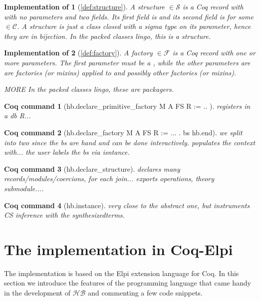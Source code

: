 \documentclass[a4paper,UKenglish,cleveref, autoref]{lipics-v2019}
\newcommand{\HB}{\ensuremath{\mathcal{HB}}}
\newcommand{\mixins}{mixins}
\newcommand{\factory}{factory}
\newcommand{\factories}{factories}
\newcommand{\packager}{packager}
\newcommand{\F}{\ensuremath{\mathcal{F}}}
\newcommand{\C}{\ensuremath{\mathcal{C}}}
\newcommand{\Str}{\ensuremath{\mathcal{S}}}
\newcommand{\structure}{structure}
\theoremstyle{implem}
\newtheorem*{implementation}{Implementation of}
\theoremstyle{implem}
\theoremstyle{axiom}
\theoremstyle{abscommand}
\theoremstyle{command}
\newtheorem*{command}{Coq command}
\begin{document}
\begin{implementation}[\autoref{def:structure}]
A \structure{}  \(\in \Str{}\) is a Coq record with with no parameters
and two fields. Its first field is  and its second field is
 for some  \(\in \C{}\).
A structure is just a class closed with a sigma type on its parameter, hence
they are in bijection.
In the packed classes lingo, this is a structure.
\end{implementation}

\begin{implementation}[\autoref{def:factory}]
A \factory{}  \(\in \F{}\) is a Coq record with one or more parameters.
The first parameter must be a , while the other parameters are
are \factories{} (or \mixins) applied to  and possibly other
\factories{} (or \mixins).

MORE
In the packed classes lingo, these are \packager{}s.
\end{implementation}

\begin{command}[hb.declare_primitive_factory M A FS R := { .. } ]
registers in a db R...
\end{command}
\begin{command}[hb.declare_factory M A FS R := {... }. bs hb.end]
we split into two since the bs are hand and can be done interactively.
populates the context with...
the user labels the bs via isntance.
\end{command}
\begin{command}[hb.declare_structure]
declares many records/modules/coercions, for each join... exports operations,
theory submodule....
\end{command}
\begin{command}[hb.instance]
very close to the abstract one, but instruments CS inference with
the synthesizedterms.
\end{command}


\section{The implementation in Coq-Elpi}\label{sec:implementation}

The implementation is based on the Elpi
extension language for Coq. In this section we introduce the features of the
programming language that came handy in the development of \HB{} and
commenting a few code snippets.
\end{document}
